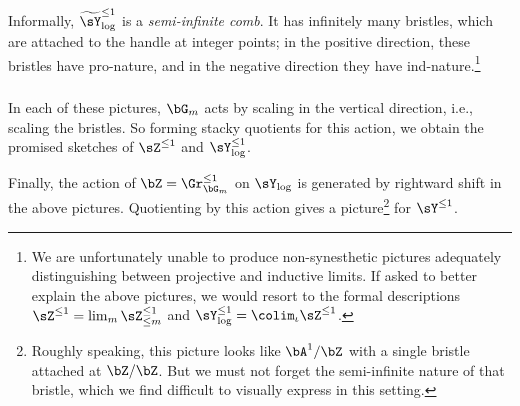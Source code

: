 Informally, $\widetilde{\sY}_{\log}^{\leq 1}$ is a \emph{semi-infinite comb}. It has
infinitely many bristles, which are attached to the handle at integer
points; in the positive direction, these bristles have
pro-nature, and in the negative direction they have ind-nature.\footnote{We
are unfortunately unable to produce non-synesthetic
pictures adequately distinguishing between projective and inductive limits.
If asked to better explain the above pictures,
we would resort to the formal descriptions
$\sZ^{\leq 1} = \lim_m \sZ_{\leq m}^{\leq 1}$ and $\sY_{\log}^{\leq 1} =
\colim_{\iota} \sZ^{\leq 1}$.}

\subsubsection{}

In each of these pictures, $\bG_m$ acts by scaling in the vertical direction, i.e.,
scaling the bristles. So forming stacky quotients for this action,
we obtain the promised sketches of
$\sZ^{\leq 1}$ and $\sY_{\log}^{\leq 1}$.

Finally, the action of $\bZ = \Gr_{\bG_m}^{\leq 1}$ on $\sY_{\log}$ is generated
by rightward shift in the above pictures. Quotienting by this action gives a
picture\footnote{Roughly speaking, this picture looks like $\bA^1/\bZ$ with a
single bristle attached at $\bZ/\bZ$. But we must not forget the semi-infinite nature
of that bristle, which we find difficult to visually express in this setting.}
for $\sY^{\leq 1}$.
